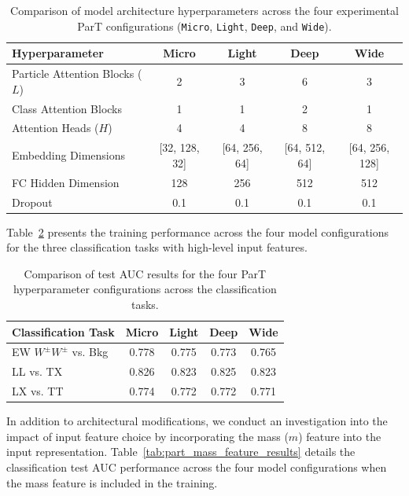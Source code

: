 \documentclass[12pt]{article}
\begin{document}
		\begin{table}[htbp]
			\centering
			\caption{Comparison of model architecture hyperparameters across the four experimental ParT configurations (\texttt{Micro}, \texttt{Light}, \texttt{Deep}, and \texttt{Wide}).}
			\label{tab:part_hyperparameters_comparison}
			\begin{tabular}{l|cccc}
				\hline
				\hline
				Hyperparameter & Micro & Light & Deep & Wide \\
				\hline
				Particle Attention Blocks ($L$) & 2 & 3 & 6 & 3 \\
				Class Attention Blocks & 1 & 1 & 2 & 1 \\
				Attention Heads ($H$) & 4 & 4 & 8 & 8 \\
				Embedding Dimensions & [32, 128, 32] & [64, 256, 64] & [64, 512, 64] & [64, 256, 128] \\
				FC Hidden Dimension & 128 & 256 & 512 & 512 \\
				Dropout & 0.1 & 0.1 & 0.1 & 0.1 \\
				\hline
				\hline
			\end{tabular}
		\end{table}

		Table~\ref{tab:part_hyperparameters_results} presents the training performance across the four model configurations for the three classification tasks with high-level input features.

		\begin{table}[htbp]
			\centering
			\caption{Comparison of test AUC results for the four ParT hyperparameter configurations across the classification tasks.}
			\label{tab:part_hyperparameters_results}
			\begin{tabular}{l|cccc}
				\hline
				\hline
                Classification Task      & Micro & Light & Deep  & Wide  \\ \hline
                EW $W^\pm W^\pm$ vs. Bkg & 0.778 & 0.775 & 0.773 & 0.765 \\
                LL vs. TX                & 0.826 & 0.823 & 0.825 & 0.823 \\
                LX vs. TT                & 0.774 & 0.772 & 0.772 & 0.771 \\
				\hline
				\hline
			\end{tabular}
		\end{table}

		In addition to architectural modifications, we conduct an investigation into the impact of input feature choice by incorporating the mass ($m$) feature into the input representation. Table~\ref{tab:part_mass_feature_results} details the classification test AUC performance across the four model configurations when the mass feature is included in the training.
\end{document}
